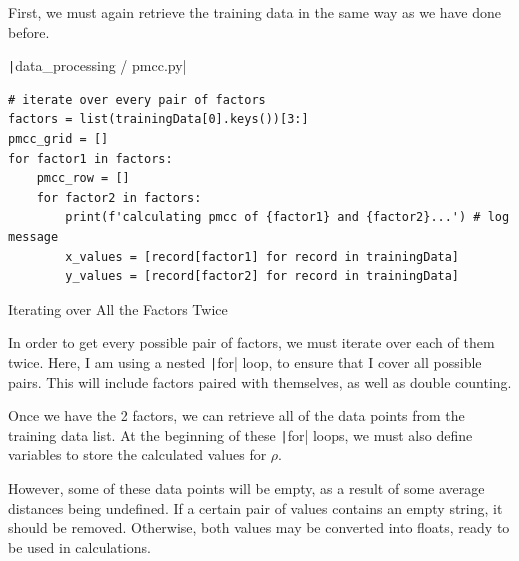 \documentclass[12pt]{report}
\newcommand{\pil}[1]{\protect\texttt|#1|}
\begin{document}
First, we must again retrieve the training data in the same way as we have done before.

\begin{listing}[H]
\pil{data_processing / pmcc.py}
\begin{verbatim}
# iterate over every pair of factors
factors = list(trainingData[0].keys())[3:]
pmcc_grid = []
for factor1 in factors:
    pmcc_row = []
    for factor2 in factors:
        print(f'calculating pmcc of {factor1} and {factor2}...') # log message
        x_values = [record[factor1] for record in trainingData]
        y_values = [record[factor2] for record in trainingData]
\end{verbatim}
\caption{Iterating over All the Factors Twice}\label{cs:iterateFactorsTwice}
\end{listing}

In order to get every possible pair of factors, we must iterate over each of them twice. Here, I am using a nested \pil{for} loop, to ensure that I cover all possible pairs. This will include factors paired with themselves, as well as double counting.

Once we have the 2 factors, we can retrieve all of the data points from the training data list. At the beginning of these \pil{for} loops, we must also define variables to store the calculated values for $\rho$.

\begin{center}
\end{center}

However, some of these data points will be empty, as a result of some average distances being undefined. If a certain pair of values contains an empty string, it should be removed. Otherwise, both values may be converted into floats, ready to be used in calculations.
\end{document}

